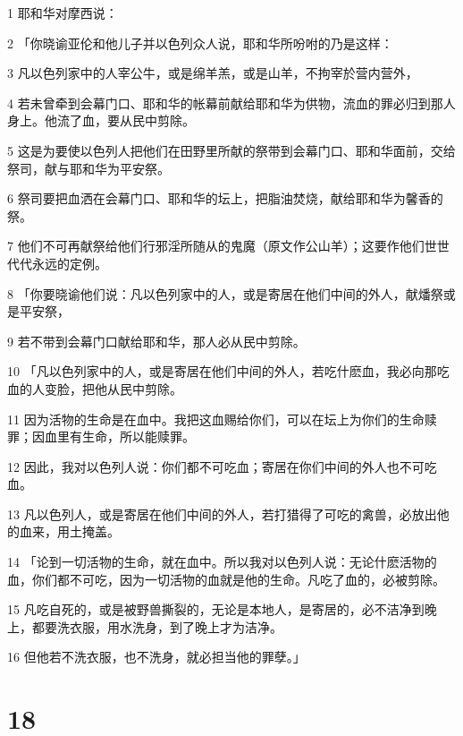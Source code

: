 \par 1 耶和华对摩西说：
\par 2 「你晓谕亚伦和他儿子并以色列众人说，耶和华所吩咐的乃是这样：
\par 3 凡以色列家中的人宰公牛，或是绵羊羔，或是山羊，不拘宰於营内营外，
\par 4 若未曾牵到会幕门口、耶和华的帐幕前献给耶和华为供物，流血的罪必归到那人身上。他流了血，要从民中剪除。
\par 5 这是为要使以色列人把他们在田野里所献的祭带到会幕门口、耶和华面前，交给祭司，献与耶和华为平安祭。
\par 6 祭司要把血洒在会幕门口、耶和华的坛上，把脂油焚烧，献给耶和华为馨香的祭。
\par 7 他们不可再献祭给他们行邪淫所随从的鬼魔（原文作公山羊）；这要作他们世世代代永远的定例。
\par 8 「你要晓谕他们说：凡以色列家中的人，或是寄居在他们中间的外人，献燔祭或是平安祭，
\par 9 若不带到会幕门口献给耶和华，那人必从民中剪除。
\par 10 「凡以色列家中的人，或是寄居在他们中间的外人，若吃什麽血，我必向那吃血的人变脸，把他从民中剪除。
\par 11 因为活物的生命是在血中。我把这血赐给你们，可以在坛上为你们的生命赎罪；因血里有生命，所以能赎罪。
\par 12 因此，我对以色列人说：你们都不可吃血；寄居在你们中间的外人也不可吃血。
\par 13 凡以色列人，或是寄居在他们中间的外人，若打猎得了可吃的禽兽，必放出他的血来，用土掩盖。
\par 14 「论到一切活物的生命，就在血中。所以我对以色列人说：无论什麽活物的血，你们都不可吃，因为一切活物的血就是他的生命。凡吃了血的，必被剪除。
\par 15 凡吃自死的，或是被野兽撕裂的，无论是本地人，是寄居的，必不洁净到晚上，都要洗衣服，用水洗身，到了晚上才为洁净。
\par 16 但他若不洗衣服，也不洗身，就必担当他的罪孽。」

\chapter{18}

